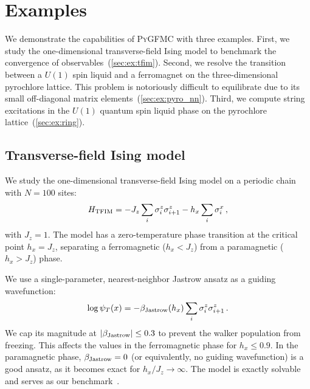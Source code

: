\documentclass{SciPost}
\providecommand{\PyGFMC}{\textsc{PyGFMC}}
\begin{document}
\section{Examples}
\label{sec:examples}
We demonstrate the capabilities of \PyGFMC{} with three examples.
%
First, we study the one-dimensional transverse-field Ising model to benchmark the convergence of observables~(\autoref{sec:ex:tfim}).
%
Second, we resolve the transition between a $U(1)$ spin liquid and a ferromagnet on the three-dimensional pyrochlore lattice.
%
This problem is notoriously difficult to equilibrate due to its small off-diagonal matrix elements~(\autoref{sec:ex:pyro_nn}).
%
Third, we compute string excitations in the $U(1)$ quantum spin liquid phase on the pyrochlore lattice~(\autoref{sec:ex:ring}).

\subsection{Transverse-field Ising model}
\label{sec:ex:tfim}
We study the one-dimensional transverse-field Ising model on a periodic chain with $N=100$ sites:
\begin{align}
	H_{\rm TFIM} = -J_z\sum_i \sigma^z_i\sigma^z_{i+1} - h_x \sum_i \sigma^x_i\,,
	\label{eq:H_TFIM}
\end{align}
with $J_z=1$.
%
The model has a zero-temperature phase transition at the critical point $h_x=J_z$, separating a ferromagnetic ($h_x < J_z$) from a paramagnetic ($h_x > J_z$) phase.

We use a single-parameter, nearest-neighbor Jastrow ansatz as a guiding wavefunction:
\begin{align}
	\log\psi_T(x) = -\beta_{\rm Jastrow}(h_x)\sum_i \sigma^z_i\sigma^z_{i+1}\,.\label{eq:jastrow_TFIM}
\end{align}
We cap its magnitude at $|\beta_{\rm Jastrow}|\leq 0.3$ to prevent the walker population from freezing.
%
This affects the values in the ferromagnetic phase for $h_x \leq 0.9$.
%
In the paramagnetic phase, $\beta_{\rm Jastrow}=0$ (or equivalently, no guiding wavefunction) is a good ansatz, as it becomes exact for $h_x/J_z\rightarrow \infty$.
%
The model is exactly solvable and serves as our benchmark~\cite{pfeuty_one-dimensional_1970}.
\end{document}
